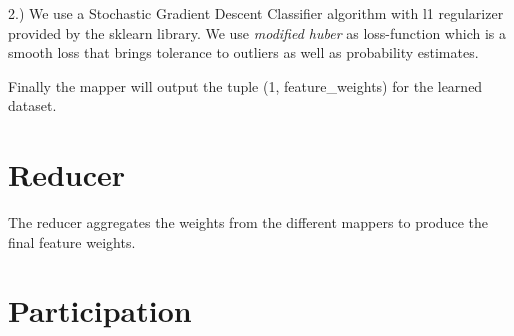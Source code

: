 \documentclass[a4paper, 11pt]{article}
\begin{document}
2.) We use a Stochastic Gradient Descent Classifier algorithm with l1 regularizer provided by the sklearn library. We use \textit{modified huber} as loss-function which is a smooth loss that brings tolerance to outliers as well as probability estimates.

Finally the mapper will output the tuple (1, feature\_weights) for the learned dataset.

\section{Reducer}

The reducer aggregates the weights from the different mappers to produce the final feature weights.

\section{Participation}
\end{document}
